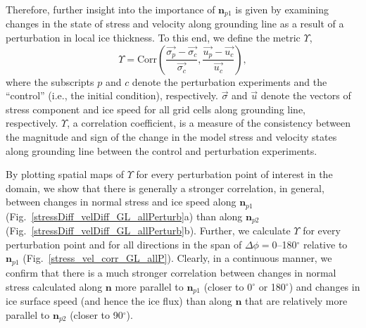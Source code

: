 \documentclass[tc, manuscript]{copernicus}
\begin{document}
Therefore, further insight into the importance of $\mathbf{n}_{p1}$ is given by examining changes in the state of stress and velocity along grounding line as a result of a perturbation in local ice thickness. To this end, we define the metric $\Upsilon$,  
\begin{equation}
    \Upsilon= \textrm{Corr}\left(\frac{\overrightarrow{\sigma_{p}}-\overrightarrow{\sigma_{c}}}{\overrightarrow{\sigma_{c}}}, \frac{\overrightarrow{u_{p}}-\overrightarrow{u_{c}}}{\overrightarrow{u_{c}}}\right),
\label{upsilon}
\end{equation}
where the subscripts $p$ and $c$ denote the perturbation experiments and the ``control'' (i.e., the initial condition), respectively. $\overrightarrow{\sigma}$ and $\overrightarrow{u}$ denote the vectors of stress component and ice speed for all grid cells along grounding line, respectively. $\Upsilon$, a correlation coefficient, is a measure of the consistency between the magnitude and sign of the change in the model stress and velocity states along grounding line between the control and perturbation experiments. 

By plotting spatial maps of $\Upsilon$ for every perturbation point of interest in the domain, we show that there is generally a stronger correlation, in general, between changes in normal stress and ice speed along $\mathbf{n}_{p1}$ (Fig.~\ref{stressDiff_velDiff_GL_allPerturb}a) than along $\mathbf{n}_{p2}$ (Fig.~\ref{stressDiff_velDiff_GL_allPerturb}b). Further, we calculate $\Upsilon$ for every perturbation point and for all directions in the span of $\Delta\phi=$0--180$^\circ$ relative to $\mathbf{n}_{p1}$ (Fig.~\ref{stress_vel_corr_GL_allP}). Clearly, in a continuous manner, we confirm that there is a much stronger correlation between changes in normal stress calculated along $\mathbf{n}$ more parallel to $\mathbf{n}_{p1}$ (closer to 0$^\circ$ or 180$^\circ$) and changes in ice surface speed (and hence the ice flux) than along $\mathbf{n}$ that are relatively more parallel to $\mathbf{n}_{p2}$ (closer to 90$^\circ$).  
\end{document}
